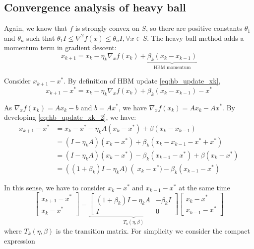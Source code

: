 \subsection{Convergence analysis of heavy ball}
\label{subsec:hbm_convergence}
Again, we know that $f$ is strongly convex on $S$, so there are positive constants $\theta_1$ and $\theta_n$ such that $\theta_1I \leq \nabla^{2}f(x) \leq \theta_nI, \forall x \in S$. The heavy ball method adds a momentum term in gradient descent:
\begin{equation}
    x_{k+1} = x_{k} - \eta_{k} \nabla_{x} f(x_k) + \underbrace{\beta_k (x_k - x_{k-1})}_{\text{HBM  momentum}}
    \label{eq:hb_update_xk}
\end{equation}

\noindent Consider $x_{k+1} - x^*$. By definition of HBM update \eqref{eq:hb_update_xk}, 
\begin{equation}
    x_{k+1} - x^* = x_{k} - \eta_{k} \nabla_{x} f(x_k) + \beta_k (x_k - x_{k-1}) - x^*
    \label{eq:hb_update_xk_2}
\end{equation}

\noindent As $\nabla_x f(x_k) = Ax_k - b$ and $b = Ax^*$, we have $\nabla_x f(x_k) = Ax_k - Ax^*$. By developing \eqref{eq:hb_update_xk_2}, we have:
\begin{equation}
\begin{aligned}
x_{k+1} - x^* &= x_k - x^* - \eta_k A(x_k - x^*) + \beta(x_k - x_{k-1}) \\
& = (I - \eta_k A)(x_k - x^*) + \beta_k (x_k - x_{k-1} -x^* + x^*) \\
& = (I - \eta_k A)(x_k - x^*) - \beta_k (x_{k-1} - x^*) + \beta(x_k - x^*)\\
&= \left((1+\beta_k)I-\eta_k A)\right(x_k - x^*) - \beta_k (x_{k-1} - x^*)
\end{aligned}
\end{equation}

\noindent In this sense, we have to consider $x_k - x^*$ and $x_{k-1} - x^* $ at the same time
\begin{equation}
\begin{bmatrix}
x_{k+1} - x^*\\
x_k - x^*
\end{bmatrix} 
=
\underbrace{\begin{bmatrix}
(1+\beta_k)I - \eta_k A & - \beta_kI\\
I & 0
\end{bmatrix}}_{T_k (\eta, \beta)}
\begin{bmatrix}
x_{k} - x^*\\
x_{k-1} - x^*
\end{bmatrix}
\end{equation}
where $T_k (\eta, \beta)$ is the transition matrix. For simplicity we consider the compact expression

